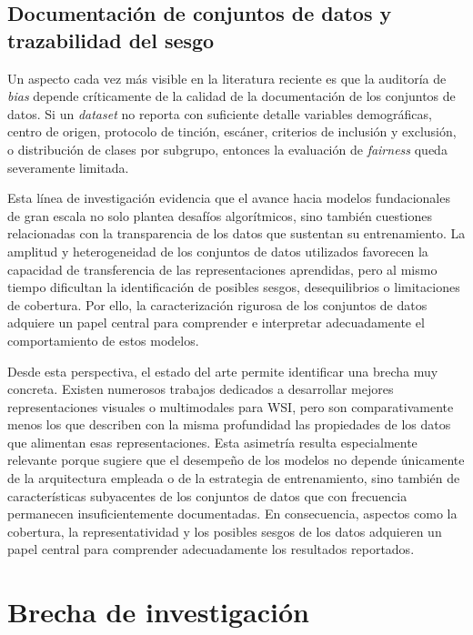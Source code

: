 \subsection{Documentación de conjuntos de datos y trazabilidad del sesgo}

Un aspecto cada vez más visible en la literatura reciente es que la auditoría de \textit{bias} depende críticamente de la calidad de la documentación de los conjuntos de datos. Si un \textit{dataset} no reporta con suficiente detalle variables demográficas, centro de origen, protocolo de tinción, escáner, criterios de inclusión y exclusión, o distribución de clases por subgrupo, entonces la evaluación de \textit{fairness} queda severamente limitada.

Esta línea de investigación evidencia que el avance hacia modelos fundacionales de gran escala no solo plantea desafíos algorítmicos, sino también cuestiones relacionadas con la transparencia de los datos que sustentan su entrenamiento. La amplitud y heterogeneidad de los conjuntos de datos utilizados favorecen la capacidad de transferencia de las representaciones aprendidas, pero al mismo tiempo dificultan la identificación de posibles sesgos, desequilibrios o limitaciones de cobertura. Por ello, la caracterización rigurosa de los conjuntos de datos adquiere un papel central para comprender e interpretar adecuadamente el comportamiento de estos modelos.

Desde esta perspectiva, el estado del arte permite identificar una brecha muy concreta. Existen numerosos trabajos dedicados a desarrollar mejores representaciones visuales o multimodales para WSI, pero son comparativamente menos los que describen con la misma profundidad las propiedades de los datos que alimentan esas representaciones. Esta asimetría resulta especialmente relevante porque sugiere que el desempeño de los modelos no depende únicamente de la arquitectura empleada o de la estrategia de entrenamiento, sino también de características subyacentes de los conjuntos de datos que con frecuencia permanecen insuficientemente documentadas. En consecuencia, aspectos como la cobertura, la representatividad y los posibles sesgos de los datos adquieren un papel central para comprender adecuadamente los resultados reportados.

\section{Brecha de investigación}


